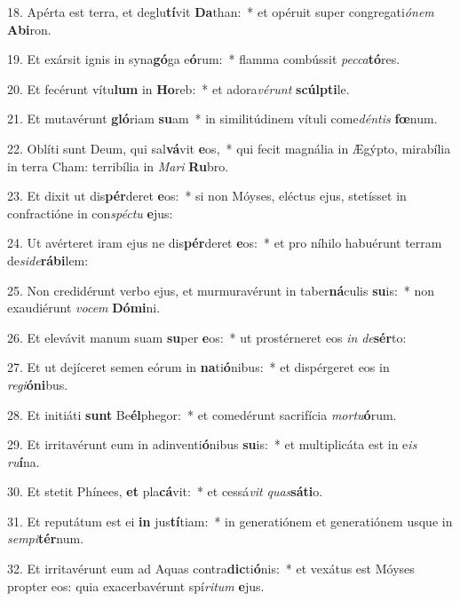 18. Apérta est terra, et deglu\textbf{tí}vit \textbf{Da}than:~*  et opéruit super congregati\textit{ó}\textit{nem} \textbf{Ab}\textbf{i}ron.\

19. Et exársit ignis in syna\textbf{gó}ga e\textbf{ó}rum:~*  flamma combússit \textit{pec}\textit{ca}\textbf{tó}res.\

20. Et fecérunt vítu\textbf{lum} in \textbf{Ho}reb:~*  et adora\textit{vé}\textit{runt} \textbf{scúlp}\textbf{ti}le.\

21. Et mutavérunt \textbf{gló}riam \textbf{su}am~*  in similitúdinem vítuli come\textit{dén}\textit{tis} \textbf{fœ}num.\

22. Oblíti sunt Deum, qui sal\textbf{vá}vit \textbf{e}os,~*  qui fecit magnália in Ægýpto, mirabília in terra Cham: terribília in \textit{Ma}\textit{ri} \textbf{Ru}bro.\

23. Et dixit ut dis\textbf{pér}deret \textbf{e}os:~*  si non Móyses, eléctus ejus, stetísset in confractióne in con\textit{spéc}\textit{tu} \textbf{e}jus:\

24. Ut avérteret iram ejus ne dis\textbf{pér}deret \textbf{e}os:~*  et pro níhilo habuérunt terram de\textit{si}\textit{de}\textbf{rá}\textbf{bi}lem:\

25. Non credidérunt verbo ejus, et murmuravérunt in taber\textbf{ná}culis \textbf{su}is:~*  non exaudiérunt \textit{vo}\textit{cem} \textbf{Dó}\textbf{mi}ni.\

26. Et elevávit manum suam \textbf{su}per \textbf{e}os:~*  ut prostérneret eos \textit{in} \textit{de}\textbf{sér}to:\

27. Et ut dejíceret semen eórum in \textbf{na}ti\textbf{ó}nibus:~*  et dispérgeret eos in \textit{re}\textit{gi}\textbf{ó}\textbf{ni}bus.\

28. Et initiáti \textbf{sunt} Be\textbf{él}phegor:~*  et comedérunt sacrifícia \textit{mor}\textit{tu}\textbf{ó}rum.\

29. Et irritavérunt eum in adinventi\textbf{ó}nibus \textbf{su}is:~*  et multiplicáta est in e\textit{is} \textit{ru}\textbf{í}na.\

30. Et stetit Phínees, \textbf{et} pla\textbf{cá}vit:~*  et cessá\textit{vit} \textit{quas}\textbf{sá}\textbf{ti}o.\

31. Et reputátum est ei \textbf{in} jus\textbf{tí}tiam:~*  in generatiónem et generatiónem usque in \textit{sem}\textit{pi}\textbf{tér}num.\

32. Et irritavérunt eum ad Aquas contra\textbf{dic}ti\textbf{ó}nis:~*  et vexátus est Móyses propter eos: quia exacerbavérunt spí\textit{ri}\textit{tum} \textbf{e}jus.\

